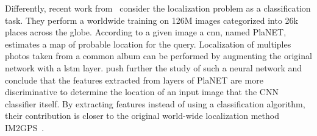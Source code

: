 			Differently, recent work from~\citet{Weyand2016} consider the localization problem as a classification task. They perform a worldwide training on 126M images categorized into 26k places across the globe. According to a given image a \ac{cnn}, named PlaNET, estimates a map of probable location for the query. Localization of multiples photos taken from a common album can be performed by augmenting the original network with a \ac{lstm} layer. \citet{Vo2017} push further the study of such a neural network and conclude that the features extracted from layers of PlaNET are more discriminative to determine the location of an input image that the CNN classifier itself. By extracting features instead of using a classification algorithm, their contribution is closer to the original world-wide localization method IM2GPS~\citep{Hays2008}.